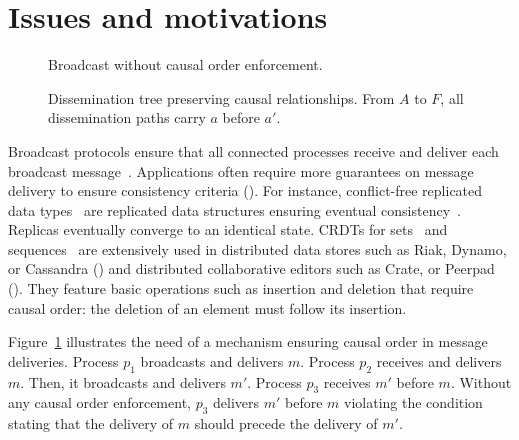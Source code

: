 
\section{Issues and motivations}
\label{sec:motivations}

\begin{figure}
  \begin{center}
  
  \caption{\label{fig:generalproblem}Broadcast without causal order
    enforcement.}
  \end{center}
\end{figure}

\begin{figure*}
  \begin{center}
    
    \caption{\label{fig:disseminationtree}Dissemination tree preserving causal
      relationships. From $A$ to $F$, all dissemination paths carry $a$ before
      $a'$.}
  \end{center}
\end{figure*}



Broadcast protocols ensure that all connected processes receive and deliver each
broadcast message~\cite{hadzilacos1994modular}. Applications often require more
guarantees on message delivery to ensure consistency criteria (\REF). For
instance, conflict-free replicated data types~\cite{shapiro2011comprehensive}
are replicated data structures ensuring eventual
consistency~\cite{bailis2013eventual}. Replicas eventually converge to an
identical state. CRDTs for sets~\cite{mukund2014optimized} and
sequences~\cite{weiss2009logoot} are extensively used in distributed data stores
such as Riak, Dynamo, or Cassandra (\REF) and distributed collaborative editors
such as Crate, or Peerpad (\REF). They feature basic operations such as
insertion and deletion that require causal order: the deletion of an element
must follow its insertion.

Figure~\ref{fig:generalproblem} illustrates the need of a mechanism ensuring
causal order in message deliveries. Process $p_1$ broadcasts and delivers
$m$. Process $p_2$ receives and delivers $m$. Then, it broadcasts and delivers
$m'$. Process $p_3$ receives $m'$ before $m$. Without any causal order
enforcement, $p_3$ delivers $m'$ before $m$ violating the condition stating that
the delivery of $m$ should precede the delivery of $m'$.

